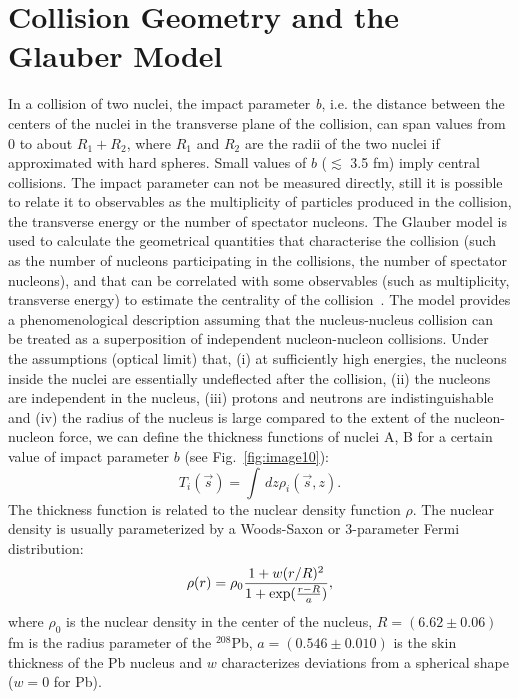 \section{Collision Geometry and the Glauber Model}
\label{sec:glauber}
In a collision of two nuclei, the impact parameter \textit{b}, i.e. the distance 
between the centers of the nuclei in the transverse plane of the collision, can 
span values from 0 to about $R_1+R_2$, where  $R_1$ and  $R_2$ are the radii of 
the two nuclei if approximated with hard spheres. 
Small values of $b$ ($\lesssim$ 3.5 fm) imply central collisions. 
The impact parameter can not be measured directly, still it is 
possible to relate it to observables as the multiplicity of particles produced in the 
collision, the transverse 
energy or the number of spectator nucleons. 
The Glauber model is used to calculate the geometrical quantities that 
characterise the collision (such as the number of nucleons participating in the collisions,
the number of spectator nucleons), and that can be correlated with some
observables (such as multiplicity, transverse energy) to estimate the centrality of the
collision~\cite{Miller:2007ri}.
The model provides a phenomenological description assuming that the nucleus-nucleus 
collision can be treated as a superposition of independent nucleon-nucleon collisions.
Under the assumptions (optical limit) that, (i) at sufficiently high energies, the nucleons 
inside the nuclei are essentially undeflected after the collision, (ii) the
 nucleons are independent in the nucleus, (iii) protons and neutrons 
 are indistinguishable and (iv) the radius of the nucleus is large compared 
 to the extent of the nucleon-nucleon force, we can define the thickness 
 functions of nuclei A, B for a certain value of impact parameter $b$ (see Fig.~\ref{fig:image10}):
\begin{equation}
T_i(\vec s) = \int\,dz \rho_i(\vec s,z).
\end{equation}
The thickness function is related to the nuclear density function $\rho$. The nuclear 
density is usually parameterized by a Woods-Saxon or 3-parameter Fermi distribution:
\begin{equation}
\rho (r) = \rho_0 \frac{1+w(r/R)^2}{1+{\rm exp}(\frac{r-R}{a})},
\end{equation}
where $\rho_0$ is the nuclear density in the center of the nucleus, 
$R = (6.62 \pm 0.06)$ fm is the radius parameter of the ${}^{208}$Pb, 
$a = (0.546 \pm 0.010)$ is the skin thickness of the Pb nucleus and $w$ 
characterizes deviations from a spherical shape ($w=0$ for Pb). 
